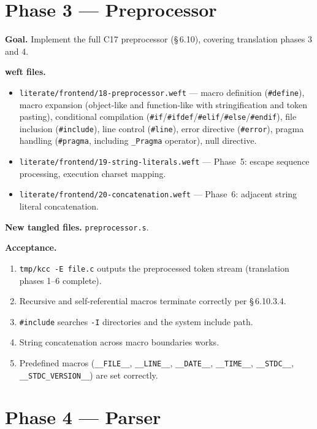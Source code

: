 \documentclass[11pt,a4paper,twoside,openright,DIV=15]{scrbook}
\theoremstyle{definition}
\theoremstyle{plain}
\theoremstyle{remark}
\newcommand{\stdref}[1]{\S\,#1}
\begin{document}
\section{Phase 3 --- Preprocessor}
\label{sec:phase3}

\textbf{Goal.}  Implement the full C17 preprocessor
(\stdref{6.10}), covering translation phases 3 and 4.

\textbf{weft files.}
\begin{itemize}
\item \texttt{literate/frontend/18-preprocessor.weft} ---
      macro definition (\texttt{\#define}), macro expansion
      (object-like and function-like with stringification and
      token pasting), conditional compilation
      (\texttt{\#if}/\texttt{\#ifdef}/\texttt{\#elif}/\texttt{\#else}/\texttt{\#endif}),
      file inclusion (\texttt{\#include}), line control
      (\texttt{\#line}), error directive (\texttt{\#error}),
      pragma handling (\texttt{\#pragma}, including
      \texttt{\_Pragma} operator), null directive.
\item \texttt{literate/frontend/19-string-literals.weft} ---
      Phase~5: escape sequence processing, execution charset
      mapping.
\item \texttt{literate/frontend/20-concatenation.weft} ---
      Phase~6: adjacent string literal concatenation.
\end{itemize}

\textbf{New tangled files.}
\texttt{preprocessor.s}.

\textbf{Acceptance.}
\begin{enumerate}
\item \texttt{tmp/kcc -E file.c} outputs the preprocessed token
      stream (translation phases 1--6 complete).
\item Recursive and self-referential macros terminate correctly
      per \stdref{6.10.3.4}.
\item \texttt{\#include} searches \texttt{-I} directories and
      the system include path.
\item String concatenation across macro boundaries works.
\item Predefined macros (\texttt{\_\_FILE\_\_},
      \texttt{\_\_LINE\_\_}, \texttt{\_\_DATE\_\_},
      \texttt{\_\_TIME\_\_}, \texttt{\_\_STDC\_\_},
      \texttt{\_\_STDC\_VERSION\_\_}) are set correctly.
\end{enumerate}

\section{Phase 4 --- Parser}
\label{sec:phase4}
\end{document}
